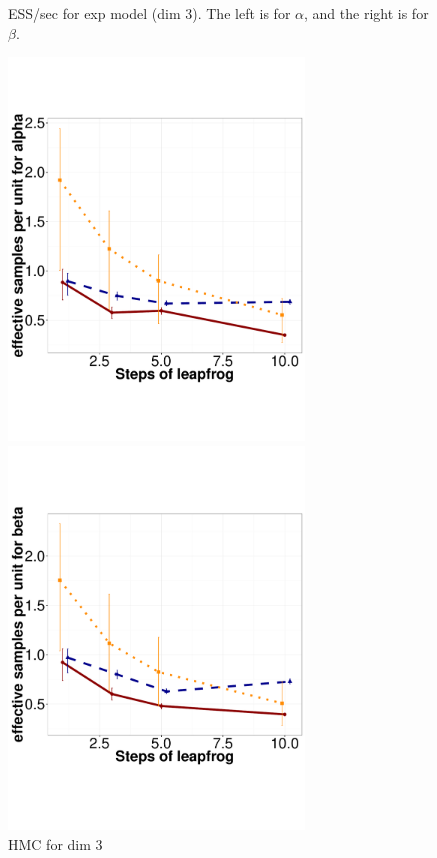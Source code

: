 \begin{figure}
\begin{minipage}[hp]{0.45\linewidth}
    \vspace{-0 in}
     \label{fig:ESS_EXP_D3}
  \end{minipage}
    \caption{ESS/sec for exp model (dim 3). The left is for $\alpha$, and the right is for $\beta$.}
  \end{figure}
  \begin{figure}[H]
  \centering
  \begin{minipage}[hp]{0.45\linewidth}
  \centering
    \includegraphics [width=0.70\textwidth, angle=0]{figs/h_alpha.pdf}
      \end{minipage}
  \begin{minipage}[hp]{0.45\linewidth}
  \centering
    \includegraphics [width=0.70\textwidth, angle=0]{figs/h_beta.pdf}
      \end{minipage}

    \caption{HMC for dim 3}
  \end{figure}


